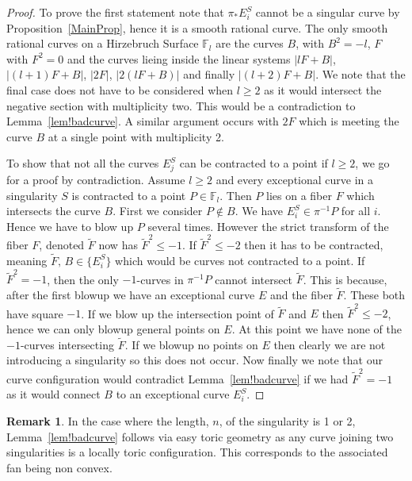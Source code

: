 \documentclass[12pt,a4paper]{book}      %
\theoremstyle{definition}
\newtheorem*{rem}{Remark}
\newcommand{\mb}[1]{\mathbb{#1}}
\newcommand{\wt}[1]{\widetilde #1}
\begin{document}
\begin{proof} 
To prove the first statement note that $\pi_* E_i^S$ cannot be a singular curve by Proposition~\ref{MainProp}, hence it is a smooth rational curve. The only smooth rational curves on a Hirzebruch Surface $\mb{F}_l$ are the curves $B$, with $B^2 = -l$, $F$ with $F^2 = 0$ and the curves lieing inside the linear systems $|lF + B|$,  $|(l+1)F + B|$, $|2F|$, $|2(lF+B)|$  and finally $|(l+2)F + B|$. We note that the final case does not have to be considered when $l \ge 2$ as it would intersect the negative section with multiplicity two. This would be a contradiction to Lemma~\ref{lem!badcurve}. A similar argument occurs with $2F$ which is meeting the curve $B$ at a single point with multiplicity 2.



To show that not all the curves $E_j^S$ can be contracted to a point if $l \geq 2$, we go for a proof by contradiction. Assume $l \ge 2$ and every exceptional curve in a singularity $S$ is contracted to a point $P \in \mb{F}_l$. Then $P$ lies on a fiber $F$ which intersects the curve $B$. First we consider $P \not\in B$. We have $E_i^S \in \pi^{-1}{P}$ for all $i$. Hence we have to blow up $P$ several times. However the strict transform of the fiber $F$, denoted $\wt{F}$ now has $\wt{F}^2 \leq -1$. If $\wt{F}^2 \leq -2$ then it has to be contracted, meaning $\wt{F}, \, B \in \{ E_i^S \}$ which would be curves not contracted to a point. If $\wt{F}^2 = -1$, then the only $-1$-curves in $\pi^{-1}{P}$ cannot intersect $\wt{F}$. This is because, after the first blowup we have an exceptional curve $E$ and the fiber $\wt{F}$. These both have square $-1$. If we blow up the intersection point of $\wt{F}$ and $E$ then $\wt{F}^2 \leq -2$, hence we can only blowup general points on $E$. At this point we have none of the $-1$-curves intersecting $\wt{F}$. If we blowup no points on $E$ then clearly we are not introducing a singularity so this does not occur. Now finally we note that our curve configuration would contradict Lemma~\ref{lem!badcurve} if we had $\wt{F}^2 = -1$ as it would connect $B$ to an exceptional curve $E_i^S$. 

\end{proof}

\begin{rem}
In the case where the length, $n$, of the singularity is 1 or 2, Lemma~\ref{lem!badcurve} follows via easy toric geometry as any curve joining two singularities is a locally toric configuration. This corresponds to the associated fan being non convex. 
\end{rem}
\end{document}
